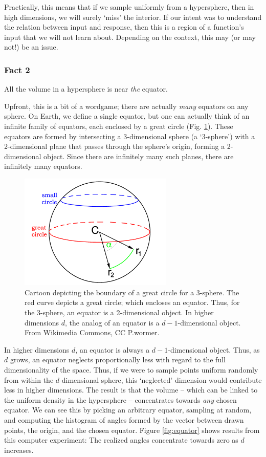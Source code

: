 \documentclass{article}
\begin{document}
Practically, this means that if we sample uniformly from a hypersphere, then in
high dimensions, we will surely `miss' the interior. If our intent was to
understand the relation between input and response, then this is a region of a
function's input that we will not learn about. Depending on the context, this
may (or may not!) be an issue.

\subsubsection{Fact 2} All the volume in a hypersphere is near
\emph{the} equator.

\bigskip
Upfront, this is a bit of a wordgame; there are actually \emph{many} equators on
any sphere. On Earth, we define a single equator, but one can actually think of
an infinite family of equators, each enclosed by a great circle (Fig.
\ref{fig:great-circle}). These equators are formed by intersecting a
3-dimensional sphere (a `3-sphere') with a 2-dimensional plane that passes
through the sphere's origin, forming a 2-dimensional object. Since there are
infinitely many such planes, there are infinitely many equators.

\begin{figure}[!ht]
  \centering
  \includegraphics[width=0.65\textwidth]{../../images/great_circle}
  \caption{Cartoon depicting the boundary of a great circle for a 3-sphere. The
    red curve depicts a great circle; which encloses an equator. Thus, for the
    3-sphere, an equator is a 2-dimensional object. In higher dimensions $d$,
    the analog of an equator is a $d-1$-dimensional object. From Wikimedia
    Commons, CC P.wormer.}
  \label{fig:great-circle}
\end{figure}

In higher dimensions $d$, an equator is always a $d-1$-dimensional object. Thus,
as $d$ grows, an equator neglects proportionally less with regard to the full
dimensionality of the space. Thus, if we were to sample points uniform randomly
from within the $d$-dimensional sphere, this `neglected' dimension would
contribute less in higher dimensions. The result is that the volume -- which can
be linked to the uniform density in the hypersphere -- concentrates towards
\emph{any} chosen equator. We can see this by picking an arbitrary equator,
sampling at random, and computing the histogram of angles formed by the vector
between drawn points, the origin, and the chosen equator. Figure
\ref{fig:equator} shows results from this computer experiment: The realized
angles concentrate towards zero as $d$ increases.
\end{document}
